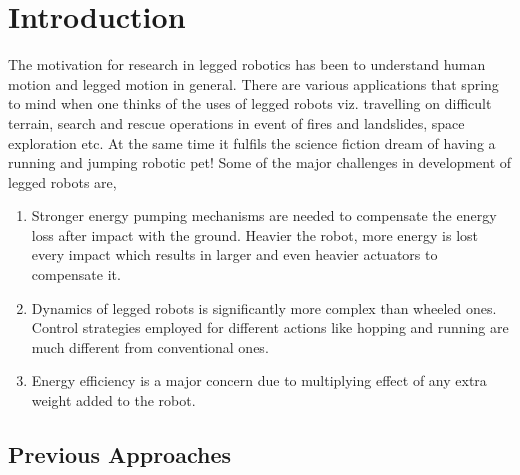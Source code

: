 \chapter{Introduction}
\label{chap:intro}

The motivation for research in legged robotics has been to understand human motion and legged motion in
general. There are various applications that spring to mind when one thinks of the uses of legged robots 
viz. travelling on difficult terrain, search and rescue operations in event of fires and landslides, space
exploration etc. At the same time it fulfils the science fiction dream of having a running and jumping 
robotic pet! Some of the major challenges in development of legged robots are, \cite{review}    
\begin{enumerate}
\item
Stronger energy pumping mechanisms are needed to compensate the energy loss after impact with the ground. Heavier the robot, more
energy is lost every impact which results in larger and even heavier actuators to compensate it.
\item
Dynamics of legged robots is significantly more complex than wheeled ones. Control strategies employed for 
different actions like hopping and running are much different from conventional ones.
\item
Energy efficiency is a major concern due to multiplying effect of any extra weight added to the robot.
\end{enumerate}

\section{Previous Approaches}
